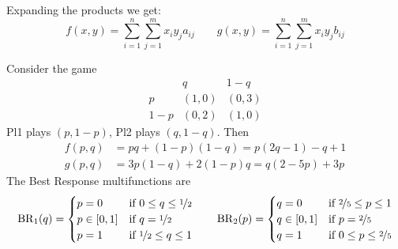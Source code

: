 \documentclass[../main.tex]{subfiles}
\begin{document}
Expanding the products we get:
\[
    f(x,y) = \sum_{i=1}^n \sum_{j=1}^m x_i y_j a_{ij}  \qquad g(x,y) = \sum_{i=1}^n \sum_{j=1}^m x_i y_j b_{ij}
\]
\begin{example}
    Consider the game
    \[
        \begin{array}{ccc}
                & q     & 1-q   \\
            p   & (1,0) & (0,3) \\
            1-p & (0,2) & (1,0)
        \end{array}
    \]
    Pl1 plays $(p,1-p)$, Pl2 plays $(q,1-q)$. Then
    \begin{align*}
        f(p,q) & = pq + (1-p)(1-q) = p(2q-1) - q +1 \\
        g(p,q) & = 3p(1-q) + 2(1-p)q = q(2-5p) + 3p
    \end{align*}
    The Best Response multifunctions are
    \[
        \operatorname{BR}_1(q) = \begin{cases}
            p = 0       & \text{if } 0 \leq q \leq \nicefrac{1}{2} \\
            p \in [0,1] & \text{if } q = \nicefrac{1}{2}           \\
            p = 1       & \text{if } \nicefrac{1}{2} \leq q \leq 1
        \end{cases}
        \qquad
        \operatorname{BR}_2(p) = \begin{cases}
            q = 0       & \text{if } \nicefrac{2}{5} \leq p \leq 1 \\
            q \in [0,1] & \text{if } p = \nicefrac{2}{5}           \\
            q = 1       & \text{if } 0 \leq p \leq \nicefrac{2}{5}
        \end{cases}
    \]
    \begin{center}
    \end{center}
\end{example}
\end{document}

